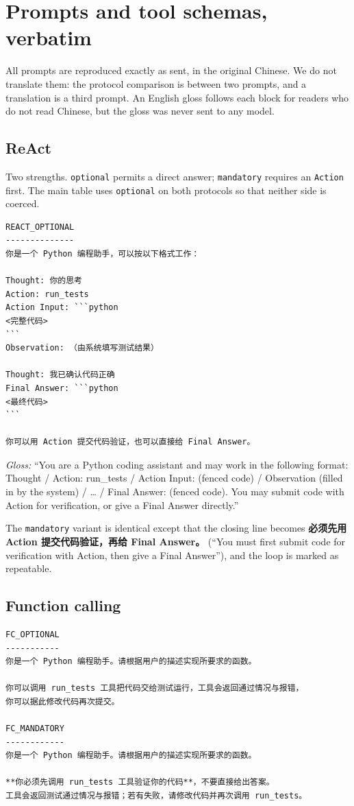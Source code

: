 \section{Prompts and tool schemas, verbatim}
\label{app:prompts}

All prompts are reproduced exactly as sent, in the original Chinese. We do not translate
them: the protocol comparison is between two prompts, and a translation is a third prompt.
An English gloss follows each block for readers who do not read Chinese, but the gloss was
never sent to any model.

\subsection{ReAct}

Two strengths. \texttt{optional} permits a direct answer; \texttt{mandatory} requires an
\texttt{Action} first. The main table uses \texttt{optional} on both protocols so that
neither side is coerced.

{\footnotesize
\begin{verbatim}
REACT_OPTIONAL
--------------
你是一个 Python 编程助手，可以按以下格式工作：

Thought: 你的思考
Action: run_tests
Action Input: ```python
<完整代码>
```
Observation: （由系统填写测试结果）

Thought: 我已确认代码正确
Final Answer: ```python
<最终代码>
```

你可以用 Action 提交代码验证，也可以直接给 Final Answer。
\end{verbatim}
}

\noindent\emph{Gloss:} ``You are a Python coding assistant and may work in the following
format: Thought / Action: run\_tests / Action Input: (fenced code) / Observation (filled in
by the system) / \ldots{} / Final Answer: (fenced code). You may submit code with Action for
verification, or give a Final Answer directly.''

The \texttt{mandatory} variant is identical except that the closing line becomes
\textbf{必须先用 Action 提交代码验证，再给 Final Answer。}
(``You must first submit code for verification with Action, then give a Final Answer''), and
the loop is marked as repeatable.

\subsection{Function calling}

{\footnotesize
\begin{verbatim}
FC_OPTIONAL
-----------
你是一个 Python 编程助手。请根据用户的描述实现所要求的函数。

你可以调用 run_tests 工具把代码交给测试运行，工具会返回通过情况与报错，
你可以据此修改代码再次提交。

FC_MANDATORY
------------
你是一个 Python 编程助手。请根据用户的描述实现所要求的函数。

**你必须先调用 run_tests 工具验证你的代码**，不要直接给出答案。
工具会返回测试通过情况与报错；若有失败，请修改代码并再次调用 run_tests。
\end{verbatim}
}


